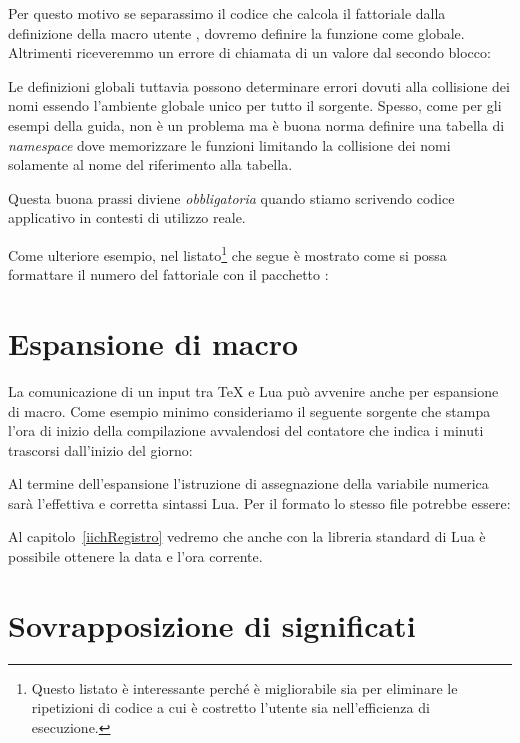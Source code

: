 Per questo motivo se separassimo il codice che calcola il fattoriale dalla
definizione della macro utente , dovremo definire la funzione
come globale. Altrimenti riceveremmo un errore di chiamata di un valore
 dal secondo blocco:

Le definizioni globali tuttavia possono determinare errori dovuti alla
collisione dei nomi essendo l'ambiente globale unico per tutto il sorgente.
Spesso, come per gli esempi della guida, non è un problema ma è buona norma
definire una tabella di \emph{namespace} dove memorizzare le funzioni limitando
la collisione dei nomi solamente al nome del riferimento alla tabella.

Questa buona prassi diviene \emph{obbligatoria} quando stiamo scrivendo codice
applicativo in contesti di utilizzo reale.

Come ulteriore esempio, nel listato\footnote{Questo listato è interessante
perché è migliorabile sia per eliminare le ripetizioni di codice a cui è
costretto l'utente sia nell'efficienza di esecuzione.} che segue è mostrato come
si possa formattare il numero del fattoriale con il pacchetto
: 


\section{Espansione di macro}

La comunicazione di un input tra \TeX{} e Lua può avvenire anche per espansione
di macro. Come esempio minimo consideriamo il seguente sorgente \LuaTeX{} che
stampa l'ora di inizio della compilazione avvalendosi del contatore 
che indica i minuti trascorsi dall'inizio del giorno:

Al termine dell'espansione l'istruzione di assegnazione della variabile numerica
 sarà l'effettiva e corretta sintassi Lua. Per il formato \LuaLaTeX{}
lo stesso file potrebbe essere:

Al capitolo~\ref{iichRegistro} vedremo che anche con la libreria standard di Lua
è possibile ottenere la data e l'ora corrente.


\section{Sovrapposizione di significati}


